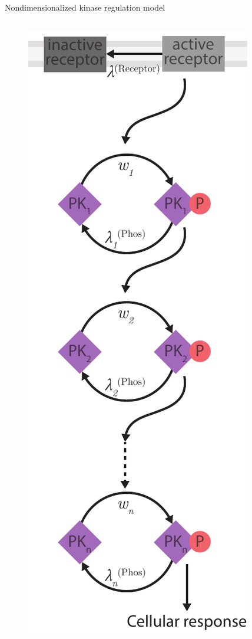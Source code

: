 \begin{frame}{Nondimensionalized kinase regulation model}
\begin{columns}
\begin{column}{0.3\textwidth}
\begin{figure}
\begin{minipage}[c]{0.617\textwidth}
\includegraphics[width=\textwidth]{theory/fig/kinase_cascade.pdf}
\end{minipage}
\end{figure}
\end{column}
\end{columns}
\end{frame}
